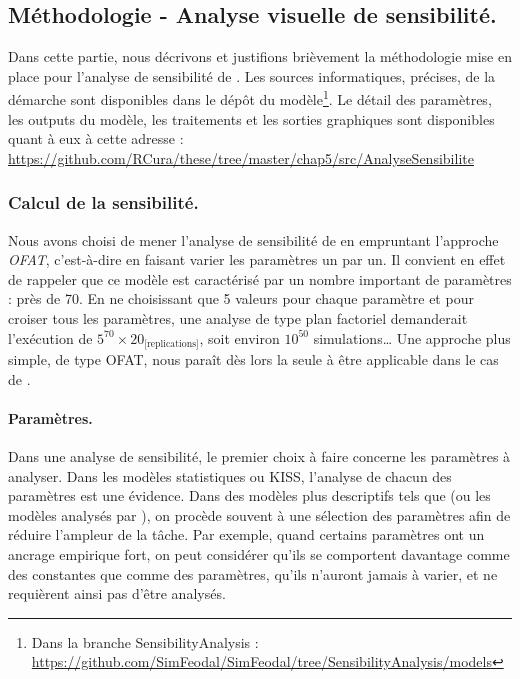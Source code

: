 \subsection{Méthodologie - Analyse visuelle de sensibilité.}

Dans cette partie, nous décrivons et justifions brièvement la méthodologie mise en place pour l'analyse de sensibilité de \simfeodal{}.
Les sources informatiques, précises, de la démarche sont disponibles dans le dépôt du modèle\footnote{
Dans la branche \og SensibilityAnalysis\fg{} :\\ \href{https://github.com/SimFeodal/SimFeodal/blob/SensibilityAnalysis/models/AnaSensib_6_5.gaml}{https://github.com/SimFeodal/SimFeodal/tree/SensibilityAnalysis/models}
}.
Le détail des paramètres, les outputs du modèle, les traitements et les sorties graphiques sont disponibles quant à eux à cette adresse :\\ \href{https://github.com/RCura/these/tree/master/chap5/src/AnalyseSensibilite}{https://github.com/RCura/these/tree/master/chap5/src/AnalyseSensibilite}

\subsubsection{Calcul de la sensibilité.}

Nous avons choisi de mener l'analyse de sensibilité de \simfeodal{} en empruntant l'approche \textit{OFAT}, c'est-à-dire en faisant varier les paramètres un par un.
Il convient en effet de rappeler que ce modèle est caractérisé par un nombre important de paramètres : près de 70.
En ne choisissant que 5 valeurs pour chaque paramètre et pour croiser tous les paramètres, une analyse de type plan factoriel demanderait l'exécution de $5^{70} \times 20_{\text{[replications]}}$, soit environ $10^{50}$ simulations\ldots{}
Une approche plus simple, de type OFAT, nous paraît dès lors la seule à être applicable dans le cas de \simfeodal{}.


\paragraph{Paramètres.}
Dans une analyse de sensibilité, le premier choix à faire concerne les paramètres à analyser.
Dans les modèles statistiques ou KISS, l'analyse de chacun des paramètres est une évidence.
Dans des modèles plus descriptifs tels que \simfeodal{} (ou les modèles analysés par \textcite{hirtzel2015exploration}), on procède souvent à une sélection des paramètres afin de réduire l'ampleur de la tâche.
Par exemple, quand certains paramètres ont un ancrage empirique fort, on peut considérer qu'ils se comportent davantage comme des constantes que comme des paramètres, qu'ils n'auront jamais à varier, et ne requièrent ainsi pas d'être analysés.

